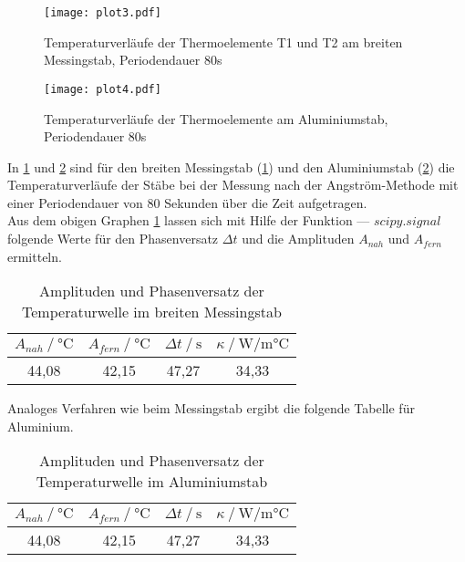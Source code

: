 \begin{figure}
  \centering
  \texttt{[image: plot3.pdf]}
  \caption{Temperaturverläufe der Thermoelemente T1 und T2 am breiten Messingstab, Periodendauer 80s}
  \label{fig:plot3}
\end{figure}

\begin{figure}
  \centering
  \texttt{[image: plot4.pdf]}
  \caption{Temperaturverläufe der Thermoelemente am Aluminiumstab, Periodendauer 80s}
  \label{fig:plot4}
\end{figure}

In \ref{fig:plot3} und \ref{fig:plot4} sind für den breiten
Messingstab (\ref{fig:plot3}) und den Aluminiumstab (\ref{fig:plot4}) die 
Temperaturverläufe der Stäbe bei der Messung nach der Angström-Methode mit einer Periodendauer von 80 Sekunden
über die Zeit aufgetragen.\\



Aus dem obigen Graphen \ref{fig:plot3} lassen sich mit Hilfe der Funktion --- $scipy.signal$ folgende 
Werte für den Phasenversatz $\Delta t$ und die Amplituden $A_{nah}$ und $A_{fern}$ ermitteln.

\begin{table}[H]   %
  \centering
  \caption{Amplituden und Phasenversatz der Temperaturwelle im breiten Messingstab}
  \begin{tabular}{cccc}
    \toprule
    {$A_{nah} \mathbin{/} \unit{\degreeCelsius}$} &
    {$A_{fern} \mathbin{/} \unit{\degreeCelsius}$} &    %
    {$\Delta t \mathbin{/} \unit{\second}$} &
    {$\kappa \mathbin{/} \unit{\watt / \milli\degreeCelsius}$} \\
    \midrule
    44,08 & 42,15 & 47,27 & 34,33 \\   
    \bottomrule
  \end{tabular}
  \label{tab:Tabelle3}
\end{table}




Analoges Verfahren wie beim Messingstab ergibt die folgende Tabelle für Aluminium.

\begin{table}[H]   %
  \centering
  \caption{Amplituden und Phasenversatz der Temperaturwelle im Aluminiumstab}
  \begin{tabular}{cccc}
    \toprule
    {$A_{nah} \mathbin{/} \unit{\degreeCelsius}$} &
    {$A_{fern} \mathbin{/} \unit{\degreeCelsius}$} &    %
    {$\Delta t \mathbin{/} \unit{\second}$} &
    {$\kappa \mathbin{/} \unit{\watt / \milli\degreeCelsius}$} \\
    \midrule
    44,08 & 42,15 & 47,27 & 34,33 \\   
    \bottomrule
  \end{tabular}
  \label{tab:Tabelle4}
\end{table}


